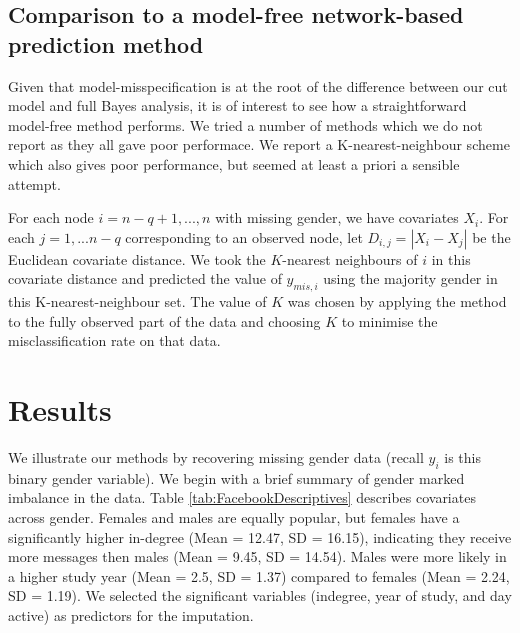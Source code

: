 \documentclass{article}
\begin{document}
\subsection{Comparison to a model-free network-based prediction method} \label{sec:modelfree}
Given that model-misspecification is at the root of the difference between our cut model and full Bayes analysis,
it is of interest to see how a straightforward model-free method performs. We tried a number of methods which we do not report as they all gave poor performace. We report a K-nearest-neighbour scheme which also gives poor performance, but seemed at least a priori a sensible attempt.

For each node $i=n-q+1,...,n$ with missing gender, we have covariates $X_i$.
For each $j=1,...n-q$ corresponding to an observed node, let $D_{i,j}=|X_i-X_j|$ be the Euclidean covariate distance. 
We took the $K$-nearest neighbours of $i$ in this covariate distance and predicted the value of $y_{mis,i}$ using 
the majority gender in this K-nearest-neighbour set. The value of $K$ was chosen by applying the method to
the fully observed part of the data and choosing $K$ to minimise the misclassification rate on that data.
\section{Results}

We illustrate our methods by recovering missing gender data (recall $y_i$ is this binary gender variable). We begin with a brief summary of gender marked imbalance in the data.
Table \ref{tab:FacebookDescriptives} describes covariates across gender. Females and males are equally popular, but females have a significantly higher in-degree (Mean = 12.47, SD = 16.15), indicating they receive more messages then males (Mean = 9.45, SD = 14.54). Males were more likely in a higher study year (Mean = 2.5, SD = 1.37) compared to females (Mean = 2.24, SD = 1.19). We selected the significant variables (indegree, year of study, and day active) as predictors for the imputation.
\end{document}
